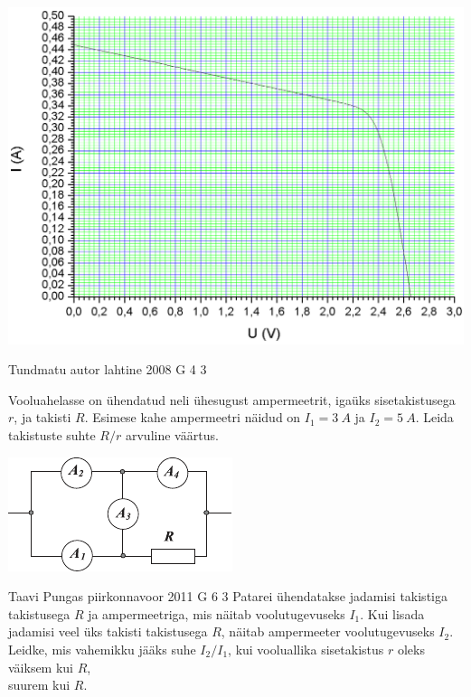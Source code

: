 \documentclass[11pt, twoside]{article}
\begin{document}
{{\begin{center}
	\includegraphics[width=0.9\linewidth]{2010-v3g-03-paneel_yl.png}
\end{center}
\fi
}

{Tundmatu autor} %
{lahtine} %
{2008} %
{G 4} %
{3} %
{
\ifStatement
Vooluahelasse on ühendatud neli ühesugust ampermeetrit, igaüks sisetakistusega $r$, ja takisti $R$. Esimese kahe ampermeetri näidud on $I_1= \SI{3}{A}$ ja $I_2= \SI{5}{A}$. Leida takistuste suhte $R/r$ arvuline väärtus.

\begin{center}
	\includegraphics[width=0.6\linewidth]{2008-lahg-04-yl}
\end{center}
\fi
}

{Taavi Pungas} %
{piirkonnavoor} %
{2011} %
{G 6} %
{3} %
{
\ifStatement
Patarei ühendatakse jadamisi takistiga takistusega $R$ ja ampermeetriga, mis näitab voolutugevuseks $I_1$. Kui lisada jadamisi veel üks takisti takistusega $R$, näitab ampermeeter voolutugevuseks $I_2$. Leidke, mis vahemikku jääks suhe $I_2/I_1$, kui vooluallika sisetakistus $r$ oleks\\
\osa väiksem kui $R$,\\
\osa suurem kui $R$.
\fi
}

}
\end{document}
